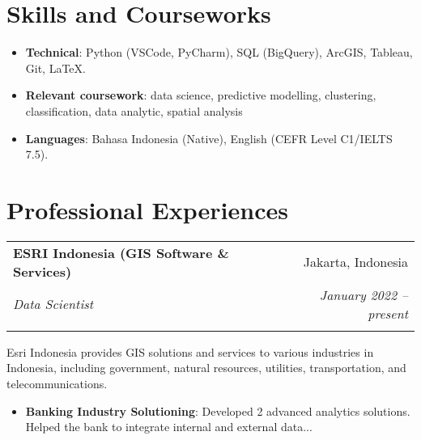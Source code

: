 \documentclass[a4paper, 11pt]{article}
\makeatletter
\newcommand{\resumeItem}[2]{
    \item\small{
        \textbf{#1}{: #2 \vspace{-2pt}}
    }
}
\newcommand{\resumeSubheading}[4]{
    \vspace{-1pt}
    \begin{tabular*}{0.97\textwidth}{l@{\extracolsep{\fill}}r}
        \color{lightblue}\textbf{#1} & #2 \\
        \textit{\small#3} & \textit{\small #4} \\
        \textnormal{}\vspace{-5pt}
    \end{tabular*}\vspace{-5pt}
}
\newcommand{\resumeSubHeadingListStart}{\begin{itemize}[leftmargin=*]}
\newcommand{\resumeItemListStart}{\begin{itemize}[leftmargin=*]\setlength\itemsep{0em}\vspace{-1pt}}
\newcommand{\resumeItemListEnd}{\end{itemize}\vspace{-5pt}}
\makeatother
\begin{document}
    
    \vspace{20pt}
    \section{Skills and Courseworks}
    \resumeItemListStart
    \resumeItem{Technical}{
        Python (VSCode, PyCharm), 
        SQL (BigQuery), 
        ArcGIS, 
        Tableau, 
        Git, 
        \LaTeX.
    }
    \resumeItem{Relevant coursework}{
        data science, 
        predictive modelling, 
        clustering, 
        classification, 
        data analytic, 
        spatial analysis
    } 
    \resumeItem{Languages}{
        Bahasa Indonesia (Native), 
        English (CEFR Level C1/IELTS 7.5).
    }
    \resumeItemListEnd
    
    \vspace{-5pt}
    \section{Professional Experiences}

    \resumeSubheading
    {ESRI Indonesia (GIS Software \& Services)}{Jakarta, Indonesia}
    {Data Scientist}{January 2022 – present}
    {Esri Indonesia provides GIS solutions and services to various industries in Indonesia, 
    including government, natural resources, utilities, transportation, and telecommunications.}
    \vspace{-5pt}
    \resumeItemListStart
    \resumeItem{Banking Industry Solutioning}{Developed 2 advanced analytics solutions. Helped the bank to integrate internal and external data...}
    \resumeItemListEnd
    
\end{document}
